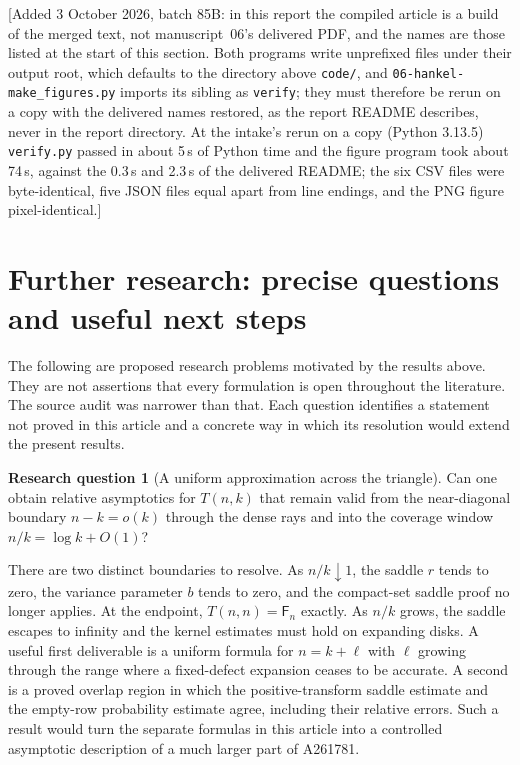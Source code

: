 \documentclass[11pt]{article}
\numberwithin{equation}{section}
\theoremstyle{definition}
\newtheorem{question}{Research question}
\theoremstyle{remark}
\begin{document}
[Added 3 October 2026, batch 85B: in this report the compiled article is
a build of the merged text, not manuscript~06's delivered PDF, and the
names are those listed at the start of this section. Both programs write
unprefixed files under their output root, which defaults to the directory
above \texttt{code/}, and \texttt{06-hankel-make\_figures.py} imports its
sibling as \texttt{verify}; they must therefore be rerun on a copy with
the delivered names restored, as the report README describes, never in
the report directory. At the intake's rerun on a copy (Python 3.13.5)
\texttt{verify.py} passed in about 5\,s of Python time and the figure
program took about 74\,s, against the 0.3\,s and 2.3\,s of the delivered
README; the six CSV files were byte-identical, five JSON files equal apart
from line endings, and the PNG figure pixel-identical.]

\section{Further research: precise questions and useful next steps}\label{mxc:sec:questions}

The following are proposed research problems motivated by the results
above. They are not assertions that every formulation is open throughout
the literature. The source audit was narrower than that. Each question
identifies a statement not proved in this article and a concrete way in
which its resolution would extend the present results.

\begin{question}[A uniform approximation across the triangle]
Can one obtain relative asymptotics for $T(n,k)$ that remain valid from
the near-diagonal boundary $n-k=o(k)$ through the dense rays and into
the coverage window $n/k=\log k+O(1)$?
\end{question}

There are two distinct boundaries to resolve. As $n/k\downarrow1$, the
saddle $r$ tends to zero, the variance parameter $b$ tends to zero, and
the compact-set saddle proof no longer applies. At the endpoint,
$T(n,n)=\mathsf F_n$ exactly. As $n/k$ grows, the saddle escapes to
infinity and the kernel estimates must hold on expanding disks.
A useful first deliverable is a uniform formula for $n=k+\ell$ with
$\ell$ growing through the range where a fixed-defect expansion ceases
to be accurate. A second is a proved overlap region in which the
positive-transform saddle estimate and the empty-row probability
estimate agree, including their relative errors. Such a result would
turn the separate formulas in this article into a controlled asymptotic
description of a much larger part of A261781.
\end{document}
